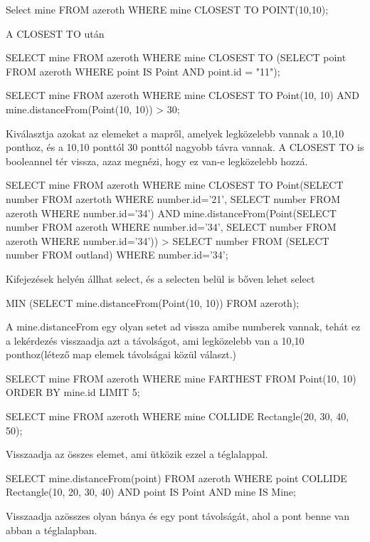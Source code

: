 \begin{sql}
\begin{sql}
Select mine
FROM azeroth
WHERE mine CLOSEST TO POINT(10,10);
\end{sql}
A CLOSEST TO után 

\begin{sql}
SELECT mine
FROM azeroth
WHERE mine CLOSEST TO (SELECT point FROM azeroth WHERE point IS Point AND point.id = "11");
\end{sql}

\begin{sql}
SELECT mine
FROM azeroth
WHERE mine CLOSEST TO Point(10, 10) AND mine.distanceFrom(Point(10, 10)) > 30;
\end{sql}
Kiválasztja azokat az elemeket a mapről, amelyek legközelebb vannak a 10,10 ponthoz, és a 10,10 ponttól 30 ponttól nagyobb távra vannak.
A CLOSEST TO is booleannel tér vissza, azaz megnézi, hogy ez van-e legközelebb hozzá.

\begin{sql}
SELECT mine
FROM azeroth
WHERE mine CLOSEST TO Point(SELECT number FROM azertoth WHERE number.id='21', SELECT number FROM azeroth WHERE number.id='34')
 AND mine.distanceFrom(Point(SELECT number FROM azeroth WHERE number.id='34', SELECT number FROM azeroth WHERE number.id='34')) > SELECT number FROM (SELECT number FROM outland) WHERE number.id='34';
\end{sql}

Kifejezések helyén állhat select, és a selecten belül is bőven lehet select

\begin{sql}
MIN (SELECT mine.distanceFrom(Point(10, 10)) FROM azeroth);
\end{sql}
A mine.distanceFrom egy olyan setet ad vissza amibe numberek vannak, tehát ez a lekérdezés visszaadja azt a távolságot, ami legközelebb van
a 10,10 ponthoz(létező map elemek távolságai közül választ.)

\begin{sql}
SELECT mine
FROM azeroth
WHERE mine FARTHEST FROM Point(10, 10)
ORDER BY mine.id
LIMIT 5;
\end{sql}

\begin{sql}
SELECT mine
FROM azeroth
WHERE mine COLLIDE Rectangle(20, 30, 40, 50);
\end{sql}
Visszaadja az összes elemet, ami ütközik ezzel a téglalappal.

\begin{sql}
SELECT mine.distanceFrom(point)
FROM azeroth
WHERE
point COLLIDE Rectangle(10, 20, 30, 40) AND
point IS Point AND
mine IS Mine;
\end{sql}
Visszaadja azösszes olyan bánya és egy pont távolságát, ahol a pont benne van abban a téglalapban.


\end{sql}
